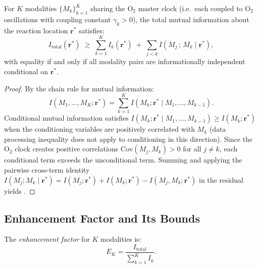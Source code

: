 \begin{theorem}
\label{thm:ch06-autocatalytic-total}
For $K$ modalities $\{M_k\}_{k=1}^K$ sharing the O$_2$ master clock
(i.e.\ each coupled to O$_2$ oscillations with coupling constant
$\gamma_k > 0$), the total mutual information about the reaction location
$\mathbf{r}^*$ satisfies:
\begin{equation}
  I_\mathrm{total}(\mathbf{r}^*)
  \;\ge\; \sum_{k=1}^K I_k(\mathbf{r}^*)
  \;+\; \sum_{j < k} I(M_j\,;\,M_k \mid \mathbf{r}^*),
  \label{eq:ch06-info-total-bound}
\end{equation}
with equality if and only if all modality pairs are informationally independent
conditional on $\mathbf{r}^*$.
\end{theorem}

\begin{proof}
By the chain rule for mutual information:
\[
  I(M_1,\ldots,M_K;\mathbf{r}^*)
  = \sum_{k=1}^K I(M_k;\mathbf{r}^* \mid M_1,\ldots,M_{k-1}).
\]
Conditional mutual information satisfies $I(M_k;\mathbf{r}^*\mid M_1,\ldots,
M_{k-1}) \ge I(M_k;\mathbf{r}^*)$ when the conditioning variables are
positively correlated with $M_k$ (data processing inequality does not apply
to conditioning in this direction).  Since the O$_2$ clock creates positive
correlations $\mathrm{Cov}(M_j,M_k) > 0$ for all $j \ne k$, each
conditional term exceeds the unconditional term.  Summing and applying the
pairwise cross-term identity $I(M_j;M_k\mid\mathbf{r}^*) = I(M_j;\mathbf{r}^*)
+ I(M_k;\mathbf{r}^*) - I(M_j,M_k;\mathbf{r}^*)$ in the residual yields
.
\end{proof}

\subsection{Enhancement Factor and Its Bounds}
\label{sec:ch06-enhancement-factor}

\begin{definition}
\label{def:ch06-enhancement-factor}
The \emph{enhancement factor} for $K$ modalities is:
\begin{equation}
  E_K = \frac{I_\mathrm{total}}{\sum_{k=1}^K I_k}.
  \label{eq:ch06-enhancement-factor}
\end{equation}
\end{definition}

